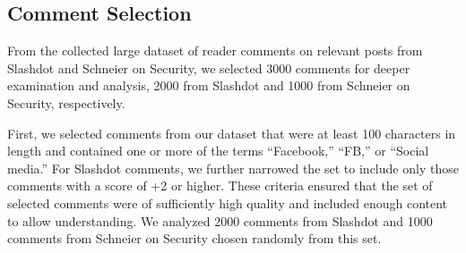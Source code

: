 
\subsection{Comment Selection}
From the collected large dataset of reader comments on relevant posts from Slashdot and Schneier on Security, we selected 3000 comments for deeper examination and analysis, 2000 from Slashdot and 1000 from Schneier on Security, respectively.

First, we selected comments from our dataset that were at least 100 characters in length and contained one or more of the terms ``Facebook,'' ``FB,'' or ``Social media.'' For Slashdot comments, we further narrowed the set to include only those comments with a score of +2 or higher. These criteria ensured that the set of selected comments were of sufficiently high quality and included enough content to allow understanding. We analyzed 2000 comments from Slashdot and 1000 comments from Schneier on Security chosen randomly from this set.


